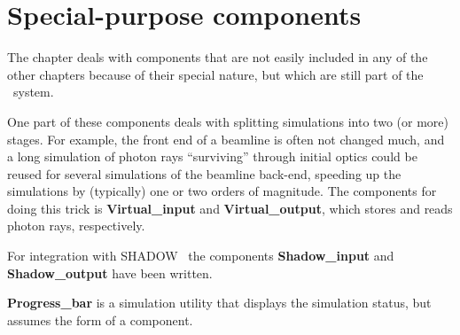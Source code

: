 \chapter{Special-purpose components}

The chapter deals with components that are not easily included
in any of the other chapters because of their special nature,
but which are still part of the \MCX\ system.

One part of these components deals with splitting simulations
into two (or more) stages. 
For example, the front end of a beamline is often not changed much, and a long simulation of photon rays
``surviving'' through initial optics could be reused
for several simulations of the beamline back-end, speeding up
the simulations by (typically) one or two orders of magnitude.
The components for doing this trick is \textbf{Virtual\_input} and
\textbf{Virtual\_output}, which stores and reads photon rays, respectively.

For integration with SHADOW~\cite{sanchez2011shadow3} the components \textbf{Shadow\_input} and \textbf{Shadow\_output}
have been written.

\textbf{Progress\_bar} is a simulation utility that displays the simulation
status, but assumes the form of a component.

\newpage









